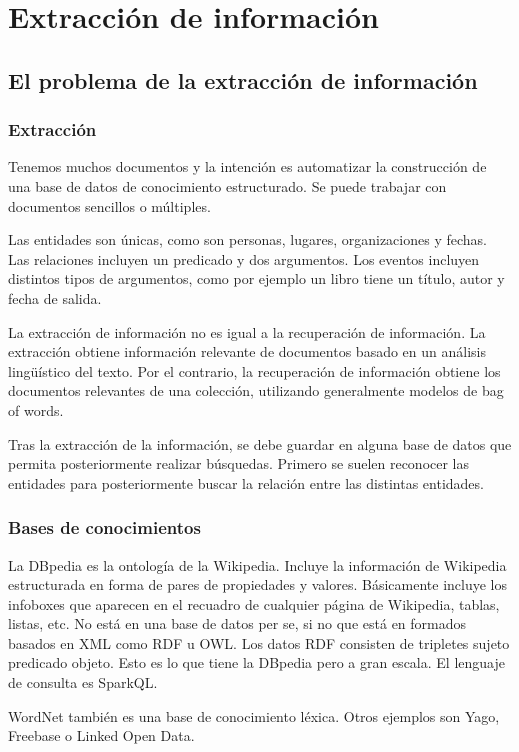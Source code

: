 \chapter{Extracción de información}
\section{El problema de la extracción de información}
\subsection{Extracción}
Tenemos muchos documentos y la intención es automatizar la construcción de una base de datos de conocimiento estructurado. Se puede trabajar con documentos sencillos o múltiples. 

Las entidades son únicas, como son personas, lugares, organizaciones y fechas. Las relaciones incluyen un predicado y dos argumentos. Los eventos incluyen distintos tipos de argumentos, como por ejemplo un libro tiene un título, autor y fecha de salida. 

La extracción de información no es igual a la recuperación de información. La extracción obtiene información relevante de documentos basado en un análisis lingüístico del texto. Por el contrario, la recuperación de información obtiene los documentos relevantes de una colección, utilizando generalmente modelos de bag of words.

Tras la extracción de la información, se debe guardar en alguna base de datos que permita posteriormente realizar búsquedas. Primero se suelen reconocer las entidades para posteriormente buscar la relación entre las distintas entidades. 

\subsection{Bases de conocimientos}
La DBpedia es la ontología de la Wikipedia. Incluye la información de Wikipedia estructurada en forma de pares de propiedades y valores. Básicamente incluye los infoboxes que aparecen en el recuadro de cualquier página de Wikipedia, tablas, listas, etc. No está en una base de datos per se, si no que está en formados basados en XML como RDF u OWL. Los datos RDF consisten de tripletes sujeto predicado objeto. Esto es lo que tiene la DBpedia pero a gran escala. El lenguaje de consulta es SparkQL.

WordNet también es una base de conocimiento léxica. Otros ejemplos son Yago, Freebase o Linked Open Data.

